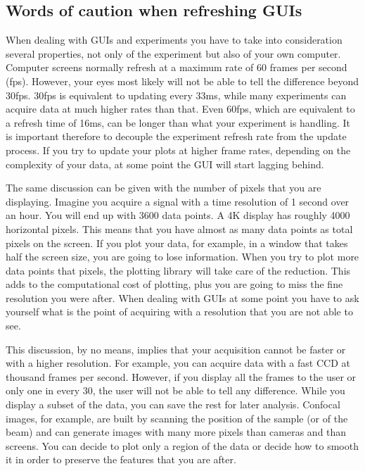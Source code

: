 \subsection{Words of caution when refreshing GUIs}\label{words-of-caution-when-refreshingguis}
When dealing with GUIs and experiments you have to take into
consideration several properties, not only of the experiment but also of
your own computer. Computer screens normally refresh at a maximum rate
of 60 frames per second (fps). However, your eyes most likely will not
be able to tell the difference beyond 30fps. 30fps is equivalent to
updating every 33ms, while many experiments can acquire data at much
higher rates than that. Even 60fps, which are equivalent to a refresh
time of 16ms, can be longer than what your experiment is handling. It is
important therefore to decouple the experiment refresh rate from the
update process. If you try to update your plots at higher frame rates,
depending on the complexity of your data, at some point the {GUI} will
start lagging behind.

The same discussion can be given with the number of pixels that you are
displaying. Imagine you acquire a signal with a time resolution of 1
second over an hour. You will end up with 3600 data points. A 4K display
has roughly 4000 horizontal pixels. This means that you have almost as
many data points as total pixels on the screen. If you plot your data,
for example, in a window that takes half the screen size, you are going
to lose information. When you try to plot more data points that pixels,
the plotting library will take care of the reduction. This adds to the
computational cost of plotting, plus you are going to miss the fine
resolution you were after. When dealing with GUIs at some point you have
to ask yourself what is the point of acquiring with a resolution that
you are not able to see.

This discussion, by no means, implies that your acquisition cannot be
faster or with a higher resolution. For example, you can acquire data
with a fast {CCD} at thousand frames per second. However, if you display
all the frames to the user or only one in every 30, the user will not be
able to tell any difference. While you display a subset of the data, you
can save the rest for later analysis. Confocal images, for example, are
built by scanning the position of the sample (or of the beam) and can
generate images with many more pixels than cameras and than screens. You
can decide to plot only a region of the data or decide how to smooth it
in order to preserve the features that you are after.

